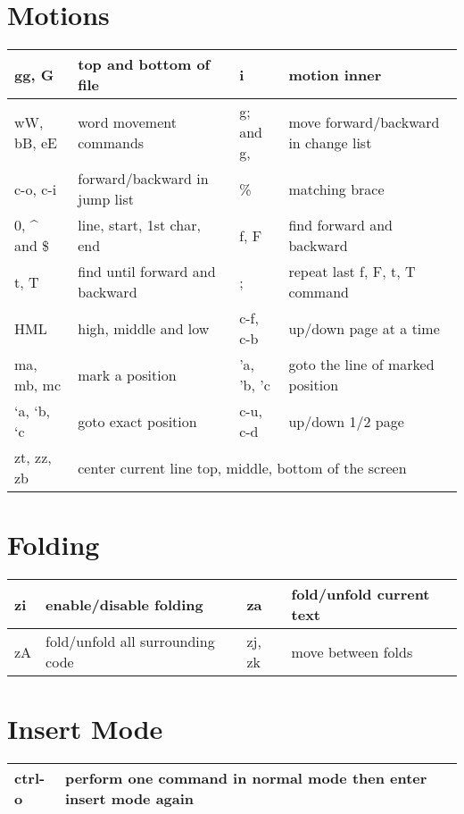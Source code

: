 \documentclass{article}
\begin{document}
\section{Motions}
\begin{tabular}{ | l | l || l | l | }
  \hline
  gg, G & top and bottom of file & i & motion inner \\ \hline
  wW, bB, eE & word movement commands & g; and g, & move forward/backward in change list \\ \hline
  c-o, c-i & forward/backward in jump list & \% & matching brace \\ \hline
  0, \^{} and \$ & line, start, 1st char, end & f, F & find forward and backward \\ \hline
  t, T & find until forward and backward & ; & repeat last f, F, t, T command \\ \hline
  HML & high, middle and low & c-f, c-b & up/down page at a time \\ \hline
  ma, mb, mc & mark a position & 'a, 'b, 'c & goto the line of marked position \\ \hline
  `a, `b, `c & goto exact position & c-u, c-d & up/down 1/2 page \\ \hline
  zt, zz, zb & \multicolumn{3}{|l|}{center current line top, middle, bottom of the screen} \\ \hline
\end{tabular}

\section{Folding}
\begin{tabular}{ | l | l || l | l | }
  \hline
  zi & enable/disable folding & za & fold/unfold current text \\ \hline
  zA & fold/unfold all surrounding code & zj, zk & move between folds \\ \hline
\end{tabular}

\section{Insert Mode}
\begin{tabular}{ | l | l || l | l | }
  \hline
  ctrl-o & \multicolumn{3}{|l|}{perform one command in normal mode then enter insert mode again} \\ \hline
\end{tabular}
\end{document}
